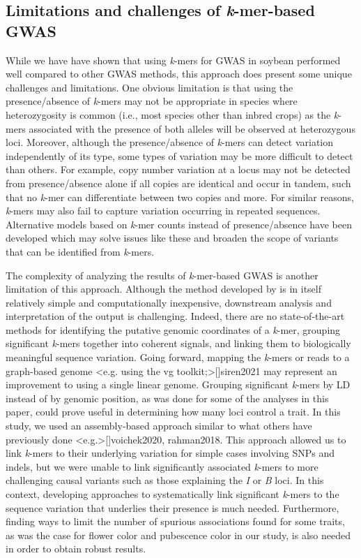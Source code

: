 \documentclass{article}
\begin{document}
\subsection*{Limitations and challenges of \emph{k}-mer-based GWAS}

While we have have shown that using \emph{k}-mers for GWAS in soybean performed
well compared to other GWAS methods, this approach does present some unique
challenges and limitations. One obvious limitation is that using the
presence/absence of \emph{k}-mers may not be appropriate in species where
heterozygosity is common (i.e., most species other than inbred crops) as the
\emph{k}-mers associated with the presence of both alleles will be observed at
heterozygous loci. Moreover, although the presence/absence of \emph{k}-mers can
detect variation independently of its type, some types of variation may be more
difficult to detect than others.  For example, copy number variation at a locus
may not be detected from presence/absence alone if all copies are identical and
occur in tandem, such that no \textit{k}-mer can differentiate between two
copies and more. For similar reasons, \emph{k}-mers may also fail to capture
variation occurring in repeated sequences. Alternative models based on
\emph{k}-mer counts instead of presence/absence have been developed
 which may solve issues like these and broaden the
scope of variants that can be identified from \emph{k}-mers.

The complexity of analyzing the results of \emph{k}-mer-based GWAS is another
limitation of this approach. Although the method developed by
 is in itself relatively simple and computationally
inexpensive, downstream analysis and interpretation of the output is
challenging. Indeed, there are no state-of-the-art methods for identifying the
putative genomic coordinates of a \emph{k}-mer, grouping significant
\emph{k}-mers together into coherent signals, and linking them to biologically
meaningful sequence variation. Going forward, mapping the \emph{k}-mers or
reads to a graph-based genome \shortcite<e.g. using the vg toolkit;>[]{siren2021}
may represent an improvement to using a single linear genome.  Grouping
significant \emph{k}-mers by LD instead of by genomic position, as was done for
some of the analyses in this paper, could prove useful in determining how many
loci control a trait. In this study, we used an assembly-based approach similar
to what others have previously done \shortcite<e.g.>[]{voichek2020, rahman2018}.
This approach allowed us to link \emph{k}-mers to their underlying variation
for simple cases involving SNPs and indels, but we were unable to link
significantly associated \emph{k}-mers to more challenging causal variants such
as those explaining the \emph{I} or \emph{B} loci. In this context, developing
approaches to systematically link significant \emph{k}-mers to the sequence
variation that underlies their presence is much needed. Furthermore, finding
ways to limit the number of spurious associations found for some traits, as was
the case for flower color and pubescence color in our study, is also needed in
order to obtain robust results.
\end{document}
